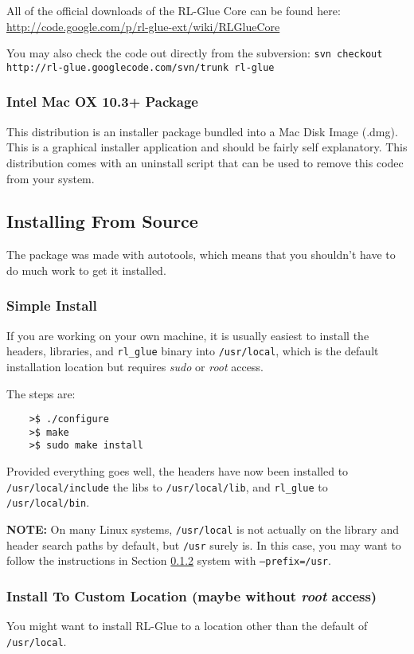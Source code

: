 \documentclass[11pt]{article}
\begin{document}
All of the official downloads of the RL-Glue Core can be found here:\newline
\url{http://code.google.com/p/rl-glue-ext/wiki/RLGlueCore}

You may also check the code out directly from the subversion:
\texttt{svn checkout http://rl-glue.googlecode.com/svn/trunk rl-glue}

\subsubsection{Intel Mac OX 10.3+ Package}
This distribution is an installer package bundled into a Mac Disk Image (.dmg).  This is a graphical installer application and should be fairly self explanatory. This distribution comes with an uninstall script that can be used to remove this codec from your system.

\subsection{Installing From Source}
The package was made with autotools, which means that you shouldn't have to do much work to get it installed.  

\subsubsection{Simple Install}
If you are working on your own machine, it is usually easiest to install the headers, libraries, and \texttt{rl\_glue} binary into \texttt{/usr/local}, which is the default 
installation location but requires \textit{sudo} or \textit{root} access.

The steps are:
\begin{verbatim}
	>$ ./configure
	>$ make
	>$ sudo make install
\end{verbatim}

Provided everything goes well, the headers have now been installed to \texttt{/usr/local/include} the libs to \texttt{/usr/local/lib}, and \texttt{rl\_glue} to \texttt{/usr/local/bin}.

\textbf{NOTE:} On many Linux systems, \texttt{/usr/local} is not actually on the library and header search paths by default, but \texttt{/usr} surely is. In this case, you may want to follow the instructions in Section \ref{custom-install-location} system with \texttt{--prefix=/usr}.


\subsubsection{Install  To Custom Location (maybe without \textit{root} access)}
\label{custom-install-location}
You might want to install RL-Glue to a location other than the default of \texttt{/usr/local}.
\end{document}

